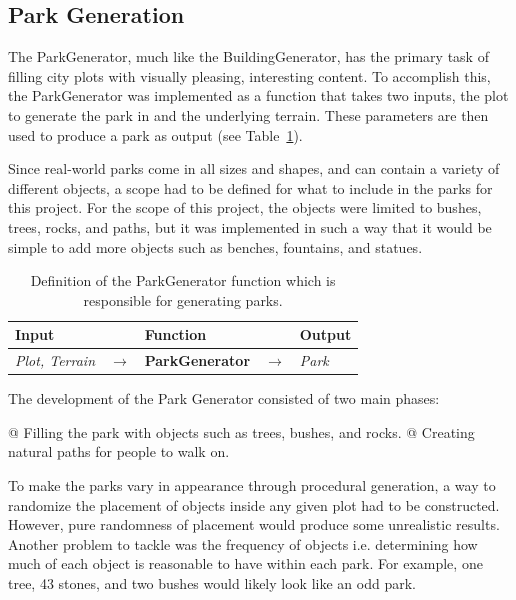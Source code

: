 \subsection{Park Generation}
The ParkGenerator, much like the BuildingGenerator, has the primary task of filling city plots with visually pleasing, interesting content. 
To accomplish this, the ParkGenerator was implemented as a function that takes two inputs, the plot to generate the park in and the underlying terrain.
These parameters are then used to produce a park as output (see Table~\ref{table:parkgen}).

Since real-world parks come in all sizes and shapes, and can contain a variety of different objects, a scope had to be defined for what to include in the parks for this project.
For the scope of this project, the objects were limited to bushes, trees, rocks, and paths, but it was implemented in such a way that it would be simple to add more objects such as benches, fountains, and statues.

\begin{table}[H]
   \centering
   \begin{tabular}{lllll}
     \textbf{Input}                           &               & \textbf{Function}            &               & \textbf{Output}         \\
     \midrule
     \textit{Plot, Terrain}                   & $\rightarrow$ & \textbf{ParkGenerator}       & $\rightarrow$ & \textit{Park}           \\
     \bottomrule
   \end{tabular}

   \caption{Definition of the ParkGenerator function which is responsible for generating parks.}
   \label{table:parkgen}
 \end{table}
 \vspace{-0.4cm}
 
The development of the Park Generator consisted of two main phases:
\begin{easylist}
 @ Filling the park with objects such as trees, bushes, and rocks.
 @ Creating natural paths for people to walk on.
\end{easylist}
To make the parks vary in appearance through procedural generation, a way to randomize the placement of objects inside any given plot had to be constructed.
However, pure randomness of placement would produce some unrealistic results.
Another problem to tackle was the frequency of objects i.e. determining how much of each object is reasonable to have within each park. 
For example, one tree, 43 stones, and two bushes would likely look like an odd park.
 
